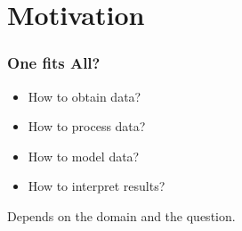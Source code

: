 \section[intro]{Motivation}

\begin{frame}
    \frametitle{One fits All?}
    \begin{itemize}
    \item How to obtain data?
    \item How to process data?
    \item How to model data?
    \item How to interpret results?
    \end{itemize}
    Depends on the domain and the question.
\end{frame}





